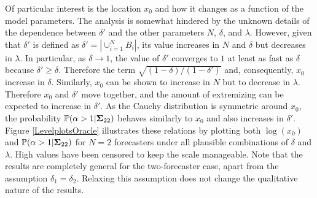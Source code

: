 \documentclass[12pt]{article}
\renewcommand{\P}{\mathbb{P}}
\theoremstyle{definition}
\theoremstyle{definition}
\def\P{{\mathbb P}}
\begin{document}
Of particular interest is the location $x_0$ and how it changes as a function of the model parameters. The analysis is somewhat hindered by the unknown details of the dependence between $\delta'$ and the other parameters $N$, $\delta$, and $\lambda$. However, given that $\delta'$ is defined as $\delta' = |\cup_{i=1}^N B_i|$, its value  increases in $N$ and $\delta$ but decreases in $\lambda$. In particular, as $\delta \to 1$, the value of $\delta'$ converges to $1$ at least as fast as $\delta$ because  $\delta' \geq \delta$. Therefore the term $\sqrt{(1-\delta)/(1-\delta')}$ and, consequently, $x_0$ increase in $\delta$. Similarly, $x_0$ can be shown to increase in $N$ but to decrease in $\lambda$. Therefore $x_0$ and $\delta'$ move together, and the amount of extremizing
can be expected to increase in $\delta'$.  As the Cauchy distribution is symmetric around $x_0$, the probability $\P(\alpha > 1 | {\bf\Sigma}_{22})$ behaves similarly to $x_0$ and also increases in $\delta'$.  
Figure \ref{LevelplotsOracle} illustrates these relations by plotting both $\log(x_0)$ and $\P(\alpha > 1 | {\bf\Sigma}_{22})$ for $N = 2$ forecasters under all plausible combinations of $\delta$ and $\lambda$. High values have been censored to keep the scale manageable. Note that the results are completely general for the two-forecaster case, apart from the assumption $\delta_1 = \delta_2$. Relaxing this assumption does not change the qualitative nature of the results.
\end{document}

